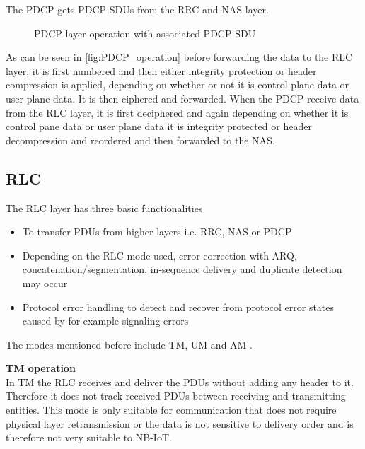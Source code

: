 The \gls{PDCP} gets \gls{PDCP} \gls{SDU}s from the \gls{RRC} and \gls{NAS} layer. 

\begin{figure}[H]
\centering
\resizebox{0.8\textwidth}{!}{
}
\caption{\gls{PDCP} layer operation with associated \gls{PDCP} \gls{SDU} \citep[fig. 6.12]{book_LTE_for_UMTS}}
\label{fig:PDCP_operation}
\end{figure}

As can be seen in \autoref{fig:PDCP_operation} before forwarding the data to the \gls{RLC} layer, it is first numbered and then either integrity protection or header compression is applied, depending on whether or not it is control plane data or user plane data. It is then ciphered and forwarded. When the \gls{PDCP} receive data from the \gls{RLC} layer, it is first deciphered and again depending on whether it is control pane data or user plane data it is integrity protected or header decompression and reordered and then forwarded to the \gls{NAS}. \citep[ch. 6.5]{book_LTE_for_UMTS}  


\subsection{RLC}

The \gls{RLC} layer has three basic functionalities \cite[ch. 6.4]{book_LTE_for_UMTS}

\begin{itemize}
	\item To transfer \gls{PDU}s from higher layers i.e. \gls{RRC}, \gls{NAS} or \gls{PDCP}
	\item Depending on the \gls{RLC} mode used, error correction with \gls{ARQ}, concatenation/segmentation, in-sequence delivery and duplicate detection may occur
	\item Protocol error handling to detect and recover from protocol error states caused by for example signaling errors
\end{itemize}

The modes mentioned before include \gls{TM}, \gls{UM} and \gls{AM} \citep[ch. 6.4]{book_LTE_for_UMTS}.

\textbf{\gls{TM} operation} \\
In \gls{TM} the \gls{RLC} receives and deliver the \gls{PDU}s without adding any header to it. Therefore it does not track received \gls{PDU}s between receiving and transmitting entities. This mode is only suitable for communication that does not require physical layer retransmission or the data is not sensitive to delivery order and is therefore not very suitable to \gls{NB-IoT}. 


